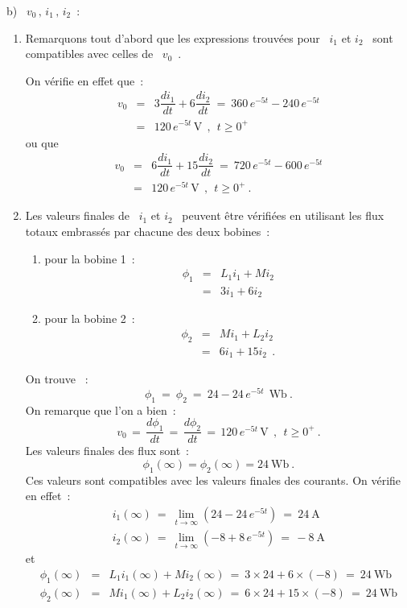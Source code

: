 \noindent b) \ $v_0\, , \, i_1\, , \, i_2$~:
\begin{enumerate}
	\item Remarquons tout d'abord que les expressions trouvées pour \
	$i_1$ et $i_2$ \ sont compatibles avec celles de \ $v_0$~.
	
	On vérifie en effet que~:
	\begin{eqnarray*}
		v_0 &=& 3 \dfrac{di_1}{dt} + 6 \dfrac{di_2}{dt} \: = \: 360\, e^{-5t} - 240\, e^{-5t}\\
		&=& 120 \, e^{-5t} \, \text{V}~~,~~ t\geq 0^+
	\end{eqnarray*}
	ou que
	\begin{eqnarray*}
		v_0 &=& 6 \dfrac{di_1}{dt} + 15 \dfrac{di_2}{dt} \: = \: 720\, e^{-5t} - 600\, e^{-5t}\\
		&=& 120 \, e^{-5t} \, \text{V}~~,~~ t\geq 0^+~.
	\end{eqnarray*}
	
	\item Les valeurs finales de \ $i_1$ et $i_2$ \ peuvent être vérifiées
	en utilisant les flux totaux embrassés par chacune des deux bobines~:
	\begin{enumerate}
		\item pour la bobine 1~: 
		\begin{eqnarray*}
			\phi_1 &=& L_1i_1 + Mi_2\\
			&=& 3i_1 + 6i_2 
		\end{eqnarray*}
		\item pour la bobine 2~: 
		\begin{eqnarray*}
			\phi_2 &=& Mi_1 + L_2i_2\\
			&=& 6i_1 + 15i_2 ~~.
		\end{eqnarray*}
	\end{enumerate}
	On trouve ~:
	\[ \phi_1 \: = \: \phi_2 \: = \: 24 - 24\, e^{-5t}~~\mbox{Wb}~. \]
	On remarque que l'on a bien~:
	\[ v_0 \, = \, \dfrac{d\phi_1}{dt} \, = \, \dfrac{d\phi_2}{dt} 
	\, = \, 120\, e^{-5t} \, \text{V}~~, ~~t\geq 0^+~. \]
	Les valeurs finales des flux sont~: 
	\[ \phi_1(\infty ) = \phi_2(\infty ) = 24~\mbox{Wb}~. \]
	Ces valeurs sont compatibles avec les valeurs finales des courants. On vérifie en effet~: 
	\begin{eqnarray*}
		i_1(\infty ) \: = \: \lim_{t\rightarrow\infty} \left( 24-24\, e^{-5t} \right) \: = \: 24~\mbox{A}\\
		i_2(\infty ) \: = \: \lim_{t\rightarrow\infty} \left( -8+8\, e^{-5t} \right) \: = \, - 8~\mbox{A}
	\end{eqnarray*}
	et
	\begin{eqnarray*}
		\phi_1(\infty )  &=& L_1i_1(\infty ) + Mi_2(\infty ) \: 
		= \: 3\times 24 + 6\times (-8) \: = \: 24~\mbox{Wb}\\
		\phi_2(\infty )  &=& Mi_1(\infty ) + L_2i_2(\infty ) \: 
		= \: 6\times 24 + 15\times (-8) \: = \: 24~\mbox{Wb}
	\end{eqnarray*}
\end{enumerate}

